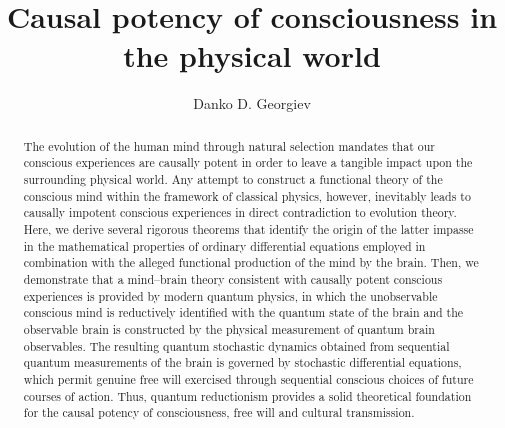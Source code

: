 \documentclass{ws-ijmpb}
\begin{document}

\catchline{}{}{}{}{}

\title{Causal potency of consciousness in the physical world}

\author{Danko D. Georgiev}

\address{Institute for Advanced Study, 30 Vasilaki Papadopulu Str.\\
Varna, 9010, Bulgaria\\
danko@q-bits.org}


\maketitle

\begin{history}
\end{history}

\begin{abstract}
The evolution of the human mind through natural selection mandates that our conscious experiences are causally potent in order to leave a tangible impact upon the surrounding physical world. Any attempt to construct a functional theory of the conscious mind within the framework of classical physics, however, inevitably leads to causally impotent conscious experiences in direct contradiction to evolution theory. Here, we derive several rigorous theorems that identify the origin of the latter impasse in the mathematical properties of ordinary differential equations employed in combination with the alleged functional production of the mind by the brain. Then, we demonstrate that a mind--brain theory consistent with causally potent conscious experiences is provided by modern quantum physics, in which the unobservable conscious mind is reductively identified with the quantum state of the brain and the observable brain is constructed by the physical measurement of quantum brain observables. The resulting quantum stochastic dynamics obtained from sequential quantum measurements of the brain is governed by stochastic differential equations, which permit genuine free will exercised through sequential conscious choices of future courses of action. Thus, quantum reductionism provides a solid theoretical foundation for the causal potency of consciousness, free will and cultural transmission.
\end{abstract}
\end{document}
